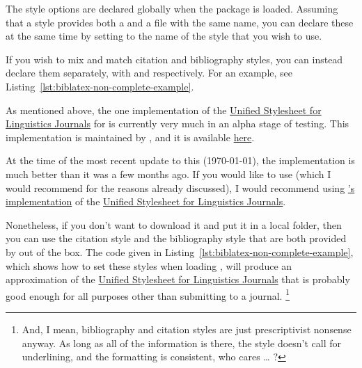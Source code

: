 The style options are declared globally when the  package is loaded.
Assuming that a style provides both a  and a  file with the same name, you can declare these at the same time by setting  to the name of the style that you wish to use.

If you wish to mix and match citation and bibliography styles, you can instead declare them separately, with  and  respectively.
For an example, see Listing~\ref{lst:biblatex-non-complete-example}.

As mentioned above, the one implementation of the \href{http://celxj.org/downloads/UnifiedStyleSheet.pdf}{Unified Stylesheet for Linguistics Journals} for  is currently very much in an alpha stage of testing.
This implementation is maintained by \href{http://semprag.org/}{}, and it is available \href{https://github.com/semprag/biblatex-sp-unified}{here}.

At the time of the most recent update to this  (\today), the implementation is much better than it was a few months ago.
If you would like to use  (which I would recommend for the reasons already discussed), I would recommend using \href{https://github.com/semprag/biblatex-sp-unified}{'s implementation} of the \href{http://celxj.org/downloads/UnifiedStyleSheet.pdf}{Unified Stylesheet for Linguistics Journals}.

Nonetheless, if you don't want to download it and put it in a local  folder, then you can use the  citation style and the  bibliography style that are both provided by  out of the box.
The code given in Listing~\ref{lst:biblatex-non-complete-example}, which shows how to set these styles when loading , will produce an approximation of the \href{http://celxj.org/downloads/UnifiedStyleSheet.pdf}{Unified Stylesheet for Linguistics Journals} that is probably good enough for all purposes other than submitting to a journal.%
\footnote{%
And, I mean, bibliography and citation styles are just prescriptivist nonsense anyway.
As long as all of the information is there, the style doesn't call for underlining, and the formatting is consistent, who cares \ldots{} ?%
}

